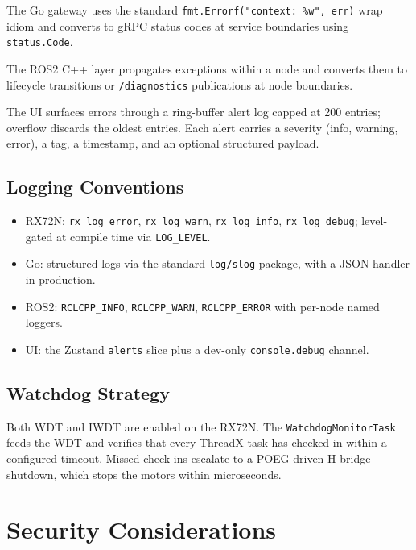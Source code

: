\documentclass[11pt,letterpaper]{article}
\begin{document}
The Go gateway uses the standard \texttt{fmt.Errorf("context: \%w",
err)} wrap idiom and converts to gRPC status codes at service
boundaries using \texttt{status.Code}.

The ROS2 C++ layer propagates exceptions within a node and converts
them to lifecycle transitions or \texttt{/diagnostics} publications
at node boundaries.

The UI surfaces errors through a ring-buffer alert log capped at 200
entries; overflow discards the oldest entries. Each alert carries a
severity (info, warning, error), a tag, a timestamp, and an optional
structured payload.

\subsection{Logging Conventions}
\begin{itemize}[leftmargin=1.4em,itemsep=2pt]
\item RX72N: \texttt{rx\_log\_error}, \texttt{rx\_log\_warn},
      \texttt{rx\_log\_info}, \texttt{rx\_log\_debug}; level-gated at
      compile time via \texttt{LOG\_LEVEL}.
\item Go: structured logs via the standard \texttt{log/slog} package,
      with a JSON handler in production.
\item ROS2: \texttt{RCLCPP\_INFO}, \texttt{RCLCPP\_WARN},
      \texttt{RCLCPP\_ERROR} with per-node named loggers.
\item UI: the Zustand \texttt{alerts} slice plus a dev-only
      \texttt{console.debug} channel.
\end{itemize}

\subsection{Watchdog Strategy}
Both WDT and IWDT are enabled on the RX72N. The
\texttt{WatchdogMonitorTask} feeds the WDT and verifies that every
ThreadX task has checked in within a configured timeout. Missed
check-ins escalate to a POEG-driven H-bridge shutdown, which stops
the motors within microseconds.

\section{Security Considerations}
\label{sec:security}
\end{document}
